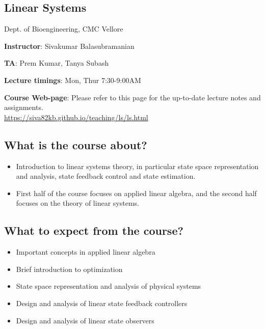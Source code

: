 \documentclass[fontsize=9pt]{scrbook}
\begin{document}
\begin{multicols}{2}
\section*{Linear Systems}
\vspace{-0.25cm}
\begin{footnotesize}
Dept. of Bioengineering, CMC Vellore
\end{footnotesize}

\vspace{0.5cm}
\textbf{Instructor}: Sivakumar Balasubramanian

\textbf{TA}: Prem Kumar, Tanya Subash

\textbf{Lecture timings}: Mon, Thur 7:30-9:00AM

\textbf{Course Web-page}: Please refer to this page for the up-to-date lecture notes and assignments.\\
\href{https://siva82kb.github.io/teaching/ls/ls.html}{https://siva82kb.github.io/teaching/ls/ls.html}

\subsection*{What is the course about?}
\begin{itemize}
\item Introduction to linear systems theory, in particular state space representation and analysis, state feedback control and state estimation.
\item First half of the course focuses on applied linear algebra, and the second half focuses on the theory of linear systems. 
\end{itemize}

\subsection*{What to expect from the course?}
\begin{itemize}
\item Important concepts in applied linear algebra
\item Brief introduction to optimization
\item State space representation and analysis of physical systems
\item Design and analysis of linear state feedback controllers
\item Design and analysis of linear state observers
\end{itemize}


\end{multicols}
\end{document}
